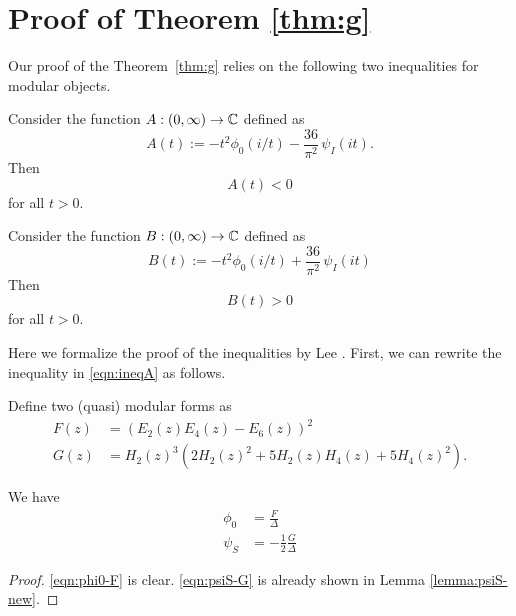 \section{Proof of Theorem \ref{thm:g}}\label{sec: g}
Our proof of the Theorem~\ref{thm:g} relies on the following two inequalities for modular objects.
\begin{proposition}\label{prop:ineqA}
Consider the function $A:(0,\infty)\to\mathbb{C}$ defined as
\begin{equation}\label{eqn:defA}
A(t):=-t^2\phi_0(i/t)-\frac{36}{\pi^2}\,\psi_I(it).
\end{equation}
Then
\begin{equation}\label{eqn:ineqA}
    A(t) < 0
\end{equation}
for all $t > 0$.
\end{proposition}

\begin{proposition}\label{prop:ineqB}
Consider the function $B:(0,\infty)\to\mathbb{C}$ defined as
\begin{equation}\label{eqn:defB}
    B(t) := -t^2\phi_0(i/t)+\frac{36}{\pi^2}\,\psi_I(it)
\end{equation}
Then
\begin{equation}\label{eqn:ineqB}
    B(t) > 0
\end{equation}
for all $t > 0$.
\end{proposition}

Here we formalize the proof of the inequalities by Lee \cite{Lee}.
First, we can rewrite the inequality in \eqref{eqn:ineqA} as follows.

\begin{definition}\label{def:FG-definition}
Define two (quasi) modular forms as
\begin{align}
    F(z) &= (E_2(z) E_4(z) - E_6(z))^2 \label{eqn:defF} \\
    G(z) &= H_2(z)^{3} (2 H_{2}(z)^{2} + 5 H_{2}(z) H_{4}(z) + 5 H_{4}(z)^{2}). \label{eqn:defG}
\end{align}
\end{definition}

\begin{lemma}\label{lemma:F-G-phi-psi-identities}
We have
\begin{align}
    \phi_0 &= \frac{F}{\Delta} \label{eqn:phi0-F} \\
    \psi_S &= -\frac{1}{2} \frac{G}{\Delta}\label{eqn:psiS-G}
\end{align}
\end{lemma}
\begin{proof}
\eqref{eqn:phi0-F} is clear.
\eqref{eqn:psiS-G} is already shown in Lemma \ref{lemma:psiS-new}.
\end{proof}

